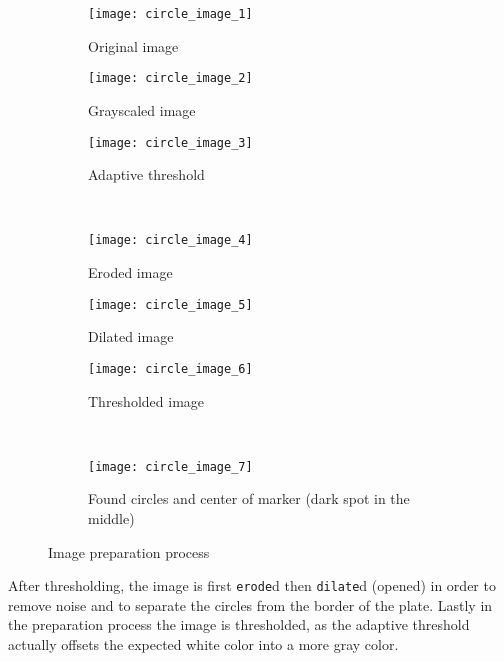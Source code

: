 \begin{figure}[ht]
\centering
\begin{subfigure}[b]{0.3\linewidth}
\centering
    \texttt{[image: circle\_image\_1]}
    \caption{Original image}
\label{fig:circle_process_examples_1}
\end{subfigure}
\begin{subfigure}[b]{0.3\linewidth}
\centering
    \texttt{[image: circle\_image\_2]}
    \caption{Grayscaled image}
\label{fig:circle_process_examples_2}
\end{subfigure}
\begin{subfigure}[b]{0.3\linewidth}
\centering
    \texttt{[image: circle\_image\_3]}
    \caption{Adaptive threshold}
\label{fig:circle_process_examples_3}
\end{subfigure}\\
\begin{subfigure}[b]{0.3\linewidth}
\centering
    \texttt{[image: circle\_image\_4]}
    \caption{Eroded image}
\label{fig:circle_process_examples_4}
\end{subfigure}
\begin{subfigure}[b]{0.3\linewidth}
\centering
    \texttt{[image: circle\_image\_5]}
    \caption{Dilated image}
\label{fig:circle_process_examples_5}
\end{subfigure}
\begin{subfigure}[b]{0.3\linewidth}
\centering
    \texttt{[image: circle\_image\_6]}
    \caption{Thresholded image}
\label{fig:circle_process_examples_6}
\end{subfigure}\\
\begin{subfigure}[b]{0.9\linewidth}
\centering
    \texttt{[image: circle\_image\_7]}
    \caption{Found circles and center of marker (dark spot in the middle)}
\label{fig:circle_process_examples_7}
\end{subfigure}
\caption{Image preparation process}
\label{fig:circle_process_examples}
\end{figure}

After thresholding, the image is first \verb|erode|d then \verb|dilate|d (opened) in order to remove noise and to separate the circles from the border of the plate.
Lastly in the preparation process the image is thresholded, as the adaptive threshold actually offsets the expected white color into a more gray color.

